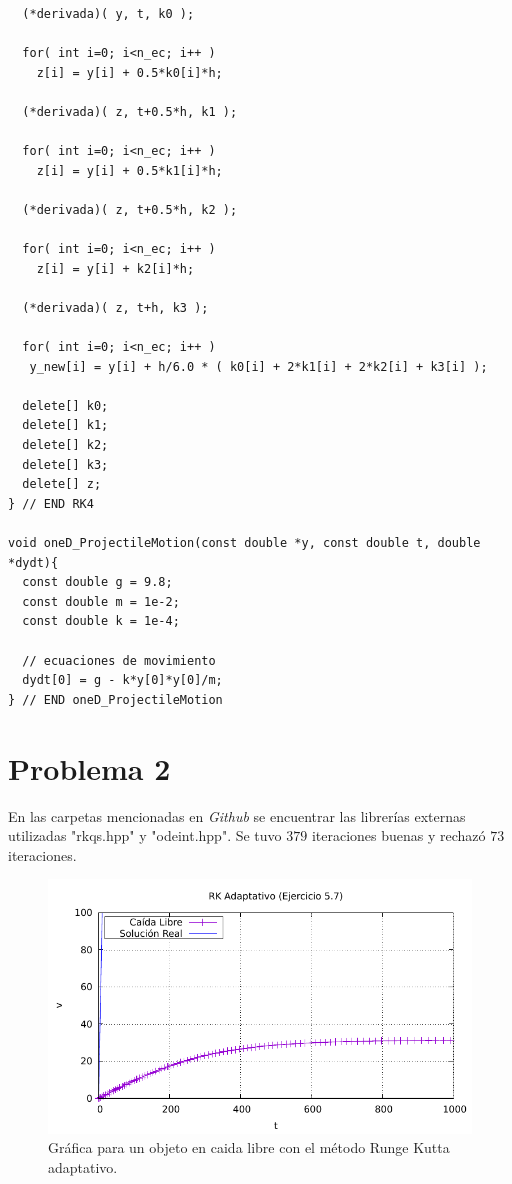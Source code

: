 \begin{lstlisting}
  (*derivada)( y, t, k0 );

  for( int i=0; i<n_ec; i++ )
    z[i] = y[i] + 0.5*k0[i]*h;

  (*derivada)( z, t+0.5*h, k1 );

  for( int i=0; i<n_ec; i++ )
    z[i] = y[i] + 0.5*k1[i]*h;

  (*derivada)( z, t+0.5*h, k2 );

  for( int i=0; i<n_ec; i++ )
    z[i] = y[i] + k2[i]*h;

  (*derivada)( z, t+h, k3 );

  for( int i=0; i<n_ec; i++ )
   y_new[i] = y[i] + h/6.0 * ( k0[i] + 2*k1[i] + 2*k2[i] + k3[i] );

  delete[] k0;
  delete[] k1;
  delete[] k2;
  delete[] k3;
  delete[] z;
} // END RK4

void oneD_ProjectileMotion(const double *y, const double t, double *dydt){
  const double g = 9.8;
  const double m = 1e-2;
  const double k = 1e-4;

  // ecuaciones de movimiento
  dydt[0] = g - k*y[0]*y[0]/m;
} // END oneD_ProjectileMotion
\end{lstlisting}

\section*{Problema 2}
En las carpetas mencionadas en \textit{Github} se encuentrar las librerías externas utilizadas "rkqs.hpp" y "odeint.hpp". Se tuvo $379$ iteraciones buenas y rechazó $73$ iteraciones. 

\begin{figure}
	\centering
	\includegraphics[scale=1]{../img/ej5-7.pdf}
	\caption{Gráfica para un objeto en caida libre con el método Runge Kutta adaptativo.}
	\label{ej5-7}
\end{figure}

